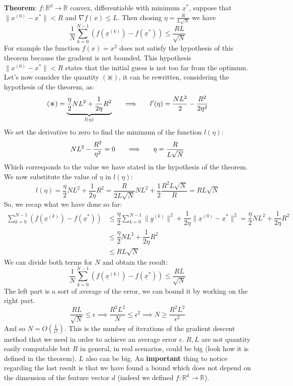 \textbf{Theorem}: $f:\mathbb{R}^d \to \mathbb{R} $ convex, differentiable with minimum $\underline{x}^*$, suppose that $\|x^{(0)} - x^*\| < R$ and $\nabla f(x) \leq L$. Then chosing $\eta = \frac{R}{L\sqrt{N}}$ we have 
\[
    \dfrac{1}{N}    \sum_{k=0}^{N-1} \left(f(\underline{x}^{(k)})-f(\underline{x}^*)\right) \leq \dfrac{RL}{\sqrt{N}}
\]
For example the function $f(x) = x^2$ does not satisfy the hypothesis of this theorem because the gradient is not bounded. This hypothesis $\|x^{(0)} - x^*\| < R$ states that the initial guess is not too far from the optimum. 
Let's now consider the quantity $(\divideontimes)$, it can be rewritten, considering the hypothesis of the theorem, as:
\[
    (\divideontimes) = \underbrace{\dfrac{\eta}{2}NL^2 + \dfrac{1}{2\eta}R^2}_{l(\eta)} \hspace{0.5cm} \implies \hspace{0.5cm} l'(\eta) = \dfrac{NL^2}{2} - \dfrac{R^2}{2\eta^2}   
\]
We set the derivative to zero to find the minimum of the function $l(\eta)$:
\[
    NL^2 - \dfrac{R^2}{\eta^2} = 0 \hspace{0.5cm} \implies \hspace{0.5cm} \eta = \dfrac{R}{L\sqrt{N}}    
\]
Which corresponds to the value we have stated in the hypothesis of the theorem. We now substitute the value of $\eta$ in $l(\eta)$:
\[
    l(\eta) = \dfrac{\eta}{2}NL^2 + \dfrac{1}{2\eta}R^2 = \dfrac{R}{2L\sqrt{N}}NL^2 + \dfrac{1}{2}\dfrac{R^2 L\sqrt{N}}{R} = RL{\sqrt{N}}
\]
So, we recap what we have done so far:
\[
    \begin{split}
        \sum_{k=0}^{N-1} \left(f(\underline{x}^{(k)})-f(\underline{x}^*)\right) &\leq \dfrac{\eta}{2} \sum_{k=0}^{N-1}\|\underline{g}^{(k)}\|^2 + \dfrac{1}{2 \eta}\|\underline{x}^{(0)} - \underline{x}^*\|^2  = \dfrac{\eta}{2}NL^2 + \dfrac{1}{2\eta}R^2\\
        &\leq \dfrac{\eta}{2}NL^2 + \dfrac{1}{2\eta}R^2\\
        &\leq RL{\sqrt{N}}
    \end{split}
\]
We can divide both terms for $N$ and obtain the result:
\[
    \dfrac{1}{N} \sum_{k=0}^{N-1} \left(f(\underline{x}^{(k)})-f(\underline{x}^*)\right) \leq \dfrac{RL}{\sqrt{N}}    
\]
The left part is a sort of average of the error, we can bound it by working on the right part. 
\[
    \dfrac{RL}{\sqrt{N}} \leq \epsilon \implies \dfrac{R^2L^2}{N} \leq \epsilon^2 \implies N \geq \dfrac{R^2L^2}{\epsilon^2}    
\]
And so $N = O(\frac{1}{\epsilon^2})$. This is the number of iterations of the gradient descent method that we need in order to achieve an average error $\epsilon$. $R,L$ are not quantity easily computable but $R$ in general, in real scenarios, could be big (look how it is defined in the theorem). $L$ also can be big. An \textbf{important} thing to notice regarding the last result is that we have found a bound which does not depend on the dimension of the feature vector $d$ (indeed we defined $f: \mathbb{R}^d \to \mathbb{R}$).

